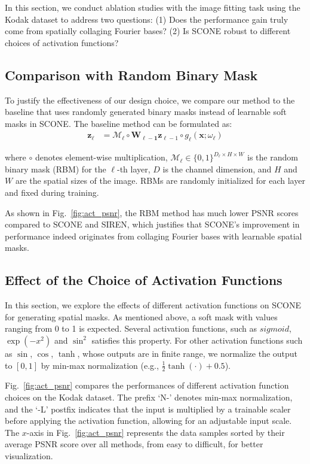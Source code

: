 \documentclass[letterpaper]{article} %
\begin{document}
In this section, we conduct ablation studies with the image fitting task using the Kodak dataset to address two questions: (1) Does the performance gain truly come from spatially collaging Fourier bases? (2) Is SCONE robust to different choices of activation functions?

\subsection{Comparison with Random Binary Mask}
 To justify the effectiveness of our design choice, we compare our method to the baseline that uses randomly generated binary masks instead of learnable soft masks in SCONE. The baseline method can be formulated as:
\begin{align*}
         \mathbf{z}_{\ell} &=  \mathcal{M}_{\ell} \circ \mathbf{W_{\ell-1}}\mathbf{z}_{\ell-1} \circ g_{\ell}(\mathbf{x};\omega_{\ell})
\end{align*}

\noindent where $\circ$ denotes element-wise multiplication, $\mathcal{M_{\ell}}\in \{0, 1\}^{D_{\ell}\times H\times W}$ is the random binary mask (RBM) for the $\ell$-th layer, $D$ is the channel dimension, and $H$ and $W$ are the spatial sizes of the image. RBMs are randomly initialized for each layer and fixed during training.

As shown in Fig.~\ref{fig:act_psnr}, the RBM method has much lower PSNR scores compared to SCONE and SIREN, which justifies that SCONE's improvement in performance indeed originates from collaging Fourier bases with learnable spatial masks.


\subsection{Effect of the Choice of Activation Functions}
\label{subsec:activation_ablation}
In this section, we explore the effects of different activation functions on SCONE for generating spatial masks. As mentioned above, a soft mask with values ranging from 0 to 1 is expected. Several activation functions, such as $\textit{sigmoid}$, $\exp(-x^2)$ and $\sin^2$ satisfies this property. For other activation functions such as $\sin$, $\cos$, $\tanh$, whose outputs are in finite range, we normalize the output to $[0, 1]$ by min-max normalization (e.g., $\frac{1}{2}\tanh(\cdot)+0.5$).

Fig.~\ref{fig:act_psnr} compares the performances of different activation function choices on the Kodak dataset. The prefix `N-' denotes min-max normalization, and the `-L' postfix indicates that the input is multiplied by a trainable scaler before applying the activation function, allowing for an adjustable input scale. The $x$-axis in Fig.~\ref{fig:act_psnr} represents the data samples sorted by their average PSNR score over all methods, from easy to difficult, for better visualization.
\end{document}
